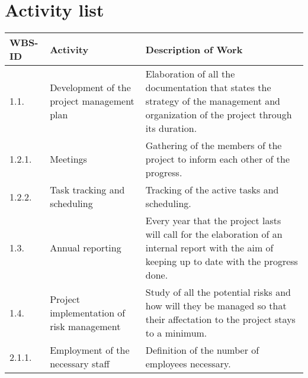 \section{Activity list}

\begin{longtable}[H]{l >{\raggedright\arraybackslash}p{4cm} p{8cm}}
	
	\toprule[2pt]
	
	\textbf{WBS-ID} &  \textbf{Activity}  & \textbf{Description of Work} \\
	
	\midrule [1.5pt]
	\endhead
	
	1.1. & Development of the project management plan &Elaboration of all the documentation that states the strategy of the management and organization of the project through its duration.\vspace{0.2cm} \\
	
	\midrule
	
	1.2.1. & Meetings & Gathering of the members of the project to inform each other of the progress.\vspace{0.2cm} \\
	
	\midrule
	
	1.2.2. & Task tracking and scheduling & Tracking of the active tasks and scheduling.\vspace{0.2cm} \\
	
	\midrule
	
	1.3. & Annual reporting & Every year that the project lasts will call for the elaboration of an internal report with the aim of keeping up to date with the progress done.\vspace{0.2cm} \\
	
	\midrule
	
	1.4. & Project implementation of risk management & Study of all the potential risks and how will they be managed so that their affectation to the project stays to a minimum.\vspace{0.2cm} \\
	
	\midrule
	
	2.1.1. & Employment of the necessary staff & Definition of the number of employees necessary.\vspace{0.2cm} \\
	
	\midrule
	

\end{longtable}
